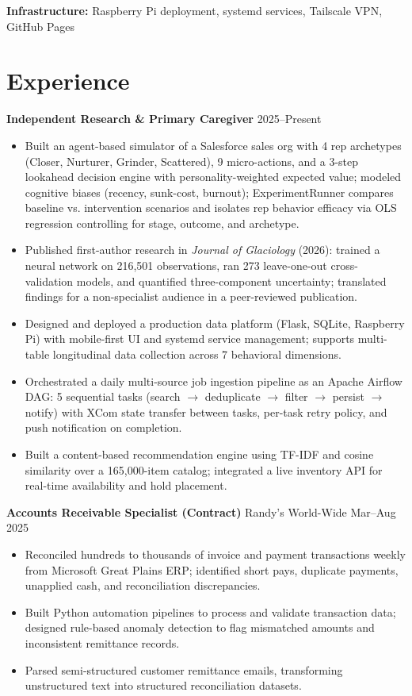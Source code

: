 \documentclass[11pt,a4paper]{article}
\begin{document}
\noindent
\textbf{Infrastructure:} Raspberry Pi deployment, systemd services, Tailscale VPN, GitHub Pages

\section*{Experience}

\noindent
\textbf{Independent Research \& Primary Caregiver} \hfill 2025--Present
\begin{itemize}
    \item Built an agent-based simulator of a Salesforce sales org with 4 rep archetypes (Closer, Nurturer, Grinder, Scattered), 9 micro-actions, and a 3-step lookahead decision engine with personality-weighted expected value; modeled cognitive biases (recency, sunk-cost, burnout); ExperimentRunner compares baseline vs. intervention scenarios and isolates rep behavior efficacy via OLS regression controlling for stage, outcome, and archetype.
    \item Published first-author research in \textit{Journal of Glaciology} (2026): trained a neural network on 216,501 observations, ran 273 leave-one-out cross-validation models, and quantified three-component uncertainty; translated findings for a non-specialist audience in a peer-reviewed publication.
    \item Designed and deployed a production data platform (Flask, SQLite, Raspberry Pi) with mobile-first UI and systemd service management; supports multi-table longitudinal data collection across 7 behavioral dimensions.
    \item Orchestrated a daily multi-source job ingestion pipeline as an Apache Airflow DAG: 5 sequential tasks (search $\rightarrow$ deduplicate $\rightarrow$ filter $\rightarrow$ persist $\rightarrow$ notify) with XCom state transfer between tasks, per-task retry policy, and push notification on completion.
    \item Built a content-based recommendation engine using TF-IDF and cosine similarity over a 165,000-item catalog; integrated a live inventory API for real-time availability and hold placement.
\end{itemize}

\vspace{0.2cm}
\noindent
\textbf{Accounts Receivable Specialist (Contract)} \hfill Randy's World-Wide \hfill Mar--Aug 2025
\begin{itemize}
    \item Reconciled hundreds to thousands of invoice and payment transactions weekly from Microsoft Great Plains ERP; identified short pays, duplicate payments, unapplied cash, and reconciliation discrepancies.
    \item Built Python automation pipelines to process and validate transaction data; designed rule-based anomaly detection to flag mismatched amounts and inconsistent remittance records.
    \item Parsed semi-structured customer remittance emails, transforming unstructured text into structured reconciliation datasets.
\end{itemize}
\end{document}
